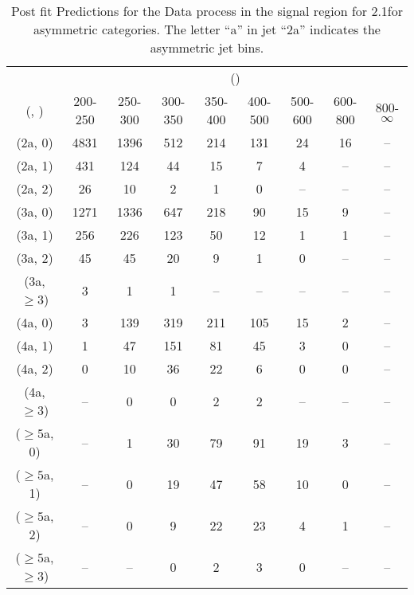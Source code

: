 \begin{table}[h!]
\tiny
\centering
\caption{Post fit Predictions for the Data process in the signal region for 2.1\ifb for asymmetric categories. The letter ``a'' in jet \eg ``2a''  indicates the asymmetric jet bins.\label{tab:predseppost_sig_data_asym}}
\begin{tabular}
{ccccccccc}
	\hline\hline
	& \multicolumn{8}{c}{\scalht (\gev)} \\ 
	 (\njet,  \nb) & 200-250 & 250-300 & 300-350 & 350-400 & 400-500 & 500-600 & 600-800 & 800-$\infty$ \\ [0.8ex] 
\hline
	(2a, 0) & 4831 & 1396 & 512 & 214 & 131 & 24 & 16 & -- \\[0.5ex] 
	(2a, 1) & 431 & 124 & 44 & 15 & 7 & 4 & -- & -- \\[0.5ex] 
	(2a, 2) & 26 & 10 & 2 & 1 & 0 & -- & -- & -- \\[0.5ex] 
	(3a, 0) & 1271 & 1336 & 647 & 218 & 90 & 15 & 9 & -- \\[0.5ex] 
	(3a, 1) & 256 & 226 & 123 & 50 & 12 & 1 & 1 & -- \\[0.5ex] 
	(3a, 2) & 45 & 45 & 20 & 9 & 1 & 0 & -- & -- \\[0.5ex] 
	(3a, $\ge3$) & 3 & 1 & 1 & -- & -- & -- & -- & -- \\[0.5ex] 
	(4a, 0) & 3 & 139 & 319 & 211 & 105 & 15 & 2 & -- \\[0.5ex] 
	(4a, 1) & 1 & 47 & 151 & 81 & 45 & 3 & 0 & -- \\[0.5ex] 
	(4a, 2) & 0 & 10 & 36 & 22 & 6 & 0 & 0 & -- \\[0.5ex] 
	(4a, $\ge3$) & -- & 0 & 0 & 2 & 2 & -- & -- & -- \\[0.5ex] 
	($\ge5$a, 0) & -- & 1 & 30 & 79 & 91 & 19 & 3 & -- \\[0.5ex] 
	($\ge5$a, 1) & -- & 0 & 19 & 47 & 58 & 10 & 0 & -- \\[0.5ex] 
	($\ge5$a, 2) & -- & 0 & 9 & 22 & 23 & 4 & 1 & -- \\[0.5ex] 
	($\ge5$a, $\ge3$) & -- & -- & 0 & 2 & 3 & 0 & -- & -- \\[0.5ex] 
	\hline
	\hline
\end{tabular}
\end{table}
